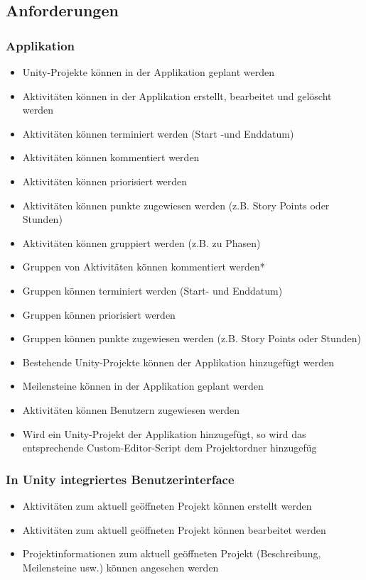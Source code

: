 \subsection{Anforderungen}
\subsubsection{Applikation}
\begin{itemize}
    \item Unity-Projekte können in der Applikation geplant werden
    \item Aktivitäten können in der Applikation erstellt, bearbeitet und gelöscht werden
    \item Aktivitäten können terminiert werden (Start -und Enddatum)
    \item Aktivitäten können kommentiert werden
    \item Aktivitäten können priorisiert werden
    \item Aktivitäten können punkte zugewiesen werden (z.B. Story Points oder Stunden)
    \item Aktivitäten können gruppiert werden (z.B. zu Phasen)
    \item Gruppen von Aktivitäten können kommentiert werden*
    \item Gruppen können terminiert werden (Start- und Enddatum)
    \item Gruppen können priorisiert werden
    \item Gruppen können punkte zugewiesen werden (z.B. Story Points oder Stunden)
    \item Bestehende Unity-Projekte können der Applikation hinzugefügt werden
    \item Meilensteine können in der Applikation geplant werden
    \item Aktivitäten können Benutzern zugewiesen werden
    \item Wird ein Unity-Projekt der Applikation hinzugefügt, so wird das entsprechende Custom-Editor-Script dem Projektordner hinzugefüg
\end{itemize}
\subsubsection{In Unity integriertes Benutzerinterface}
\begin{itemize}
    \item  Aktivitäten zum aktuell geöffneten Projekt können erstellt werden
    \item Aktivitäten zum aktuell geöffneten Projekt können bearbeitet werden
    \item Projektinformationen zum aktuell geöffneten Projekt (Beschreibung, Meilensteine usw.) können angesehen werden
\end{itemize}
